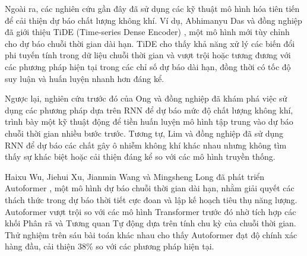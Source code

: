 Ngoài ra, các nghiên cứu gần đây đã sử dụng các kỹ thuật mô hình hóa tiên tiến để cải thiện dự báo chất lượng không khí. Ví dụ, Abhimanyu Das và đồng nghiệp đã giới thiệu TiDE (Time-series Dense Encoder) \cite{b5}, một mô hình mới tùy chỉnh cho dự báo chuỗi thời gian dài hạn. TiDE cho thấy khả năng xử lý các biến đổi phi tuyến tính trong dữ liệu chuỗi thời gian và vượt trội hoặc tương đương với các phương pháp hiện tại trong các chỉ số dự báo dài hạn, đồng thời có tốc độ suy luận và huấn luyện nhanh hơn đáng kể.

Ngược lại, nghiên cứu trước đó của Ong và đồng nghiệp \cite{b6} đã khám phá việc sử dụng các phương pháp dựa trên RNN để dự báo mức độ chất lượng không khí, trình bày một kỹ thuật động để tiền huấn luyện mô hình tập trung vào dự báo chuỗi thời gian nhiều bước trước. Tương tự, Lim và đồng nghiệp \cite{b7} đã sử dụng RNN để dự báo các chất gây ô nhiễm không khí khác nhau nhưng không tìm thấy sự khác biệt hoặc cải thiện đáng kể so với các mô hình truyền thống.

Haixu Wu, Jiehui Xu, Jianmin Wang và Mingsheng Long đã phát triển Autoformer \cite{b8}, một mô hình dự báo chuỗi thời gian dài hạn, nhằm giải quyết các thách thức trong dự báo thời tiết cực đoan và lập kế hoạch tiêu thụ năng lượng. Autoformer vượt trội so với các mô hình Transformer trước đó nhờ tích hợp các khối Phân rã và Tương quan Tự động dựa trên tính chu kỳ của chuỗi thời gian. Thử nghiệm trên sáu bài toán khác nhau cho thấy Autoformer đạt độ chính xác hàng đầu, cải thiện 38\% so với các phương pháp hiện tại.